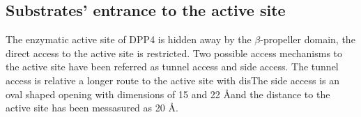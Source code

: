 \subsection{Substrates' entrance to the active site}

The enzymatic active site of DPP4 is hidden away by the $\beta$-propeller domain, the direct access to the active site is restricted. Two possible access mechanisms to the active site have been referred as tunnel access and side access. The tunnel access is relative a longer route to the active site with disThe side access is an oval shaped opening with dimensions of 15 and 22 \AA and the distance to the active site has been messasured as 20 \AA.~\cite{Engel_2003}